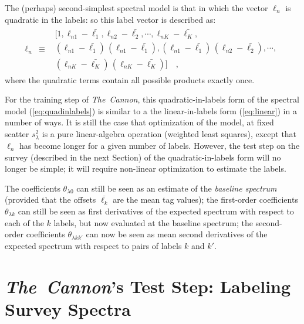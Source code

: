 \documentclass[12pt, preprint]{aastex}
\newcommand{\tc}{\textsl{The~Cannon}}
\newcommand{\set}[1]{\bm{#1}}
\newcommand{\starlabel}{\ell}
\newcommand{\starlabelvec}{\set{\starlabel}}
\newcommand{\mean}[1]{\overline{#1}}
\begin{document}
The (perhaps) second-simplest spectral model is that in which the
vector $\starlabelvec_n$ is quadratic in the labels: so this label vector is described as:
\begin{eqnarray}
\starlabelvec_n &\equiv& \begin{array}{l}[1,
                          \starlabel_{n1} - \bar{\starlabel_1},
                          \starlabel_{n2} - \bar{\starlabel_2},
                          \cdots,
                          \starlabel_{nK} - \bar{\starlabel_K},\\
                          (\starlabel_{n1} - \bar{\starlabel_1})\,(\starlabel_{n1} - \bar{\starlabel_1}),
                          (\starlabel_{n1} - \bar{\starlabel_1})\,(\starlabel_{n2} - \bar{\starlabel_2}),
                          \cdots,\\
                          (\starlabel_{nK} - \bar{\starlabel_K})\,(\starlabel_{nK} - \bar{\starlabel_K})]\quad ,
\end{array}
\label{eq:quadinlabels}
\end{eqnarray}
where the quadratic terms contain all possible products exactly once.

For the training step of \tc , this quadratic-in-labels form of the spectral model (\ref{eq:quadinlabels}) is similar to a the linear-in-labels form (\ref{eq:linear}) in a number
of ways.
It is still the case that optimization of the model, at fixed scatter
$s_\lambda^2$ is a pure linear-algebra operation (weighted least
squares), except that $\starlabelvec_n$ has become longer for a given number of labels. 
However, the test step on the survey (described in the next Section) of the quadratic-in-labels form
 will no longer be simple; it will require non-linear
optimization to estimate the labels.

The coefficients $\theta_{\lambda 0}$ can still be seen as an estimate of the
\emph{baseline spectrum} (provided that the offsets $\mean{\starlabel_k}$ are the
mean tag values); the first-order coefficients $\theta_{\lambda k}$ can still
be seen as first derivatives of the expected spectrum with respect to
each of the $k$ labels, but now evaluated at the baseline spectrum; the
second-order coefficients $\theta_{\lambda kk'}$ can now be seen as mean
second derivatives of the expected spectrum with respect to pairs of
labels $k$ and $k'$.

\section{\tc's Test Step: Labeling Survey Spectra}
\label{sec:paramestimate}
\end{document}
